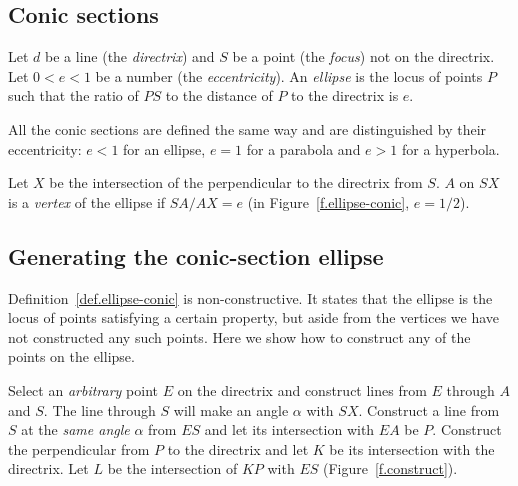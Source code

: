 
\subsection*{Conic sections}

\begin{definition}\label{def.ellipse-conic}
Let $d$ be a line (the \emph{directrix}) and $S$ be a point (the \emph{focus}) not on the directrix. Let $0<e<1$ be a number (the \emph{eccentricity}). An \emph{ellipse} is the locus of points $P$ such that the ratio of  $PS$ to the distance of $P$ to the directrix is $e$.
\end{definition}
All the conic sections  are defined the same way and are distinguished by their eccentricity: $e<1$ for an ellipse, $e=1$ for a parabola and $e>1$ for a hyperbola.

\begin{definition}\label{def.vertex}
Let $X$ be the intersection of the perpendicular to the directrix from $S$. $A$ on $SX$ is a \emph{vertex} of the ellipse if $SA/AX=e$ (in Figure~\ref{f.ellipse-conic}, $e=1/2$).
\end{definition}


\subsection*{Generating the conic-section ellipse}

Definition~\ref{def.ellipse-conic} is non-constructive. It states that the ellipse is the locus of points satisfying a certain property, but aside from the vertices we have not constructed any such points. Here we show how to construct any of the points on the ellipse.

Select an \emph{arbitrary} point $E$ on the directrix and construct lines from $E$ through $A$ and $S$. The line through $S$ will make an angle $\alpha$ with $SX$. Construct a line from $S$ at the \emph{same angle} $\alpha$ from $ES$ and let its intersection with $EA$ be $P$. Construct the perpendicular from $P$ to the directrix and let $K$ be its intersection with the directrix. Let $L$ be the intersection of $KP$ with $ES$ (Figure~\ref{f.construct}). 


